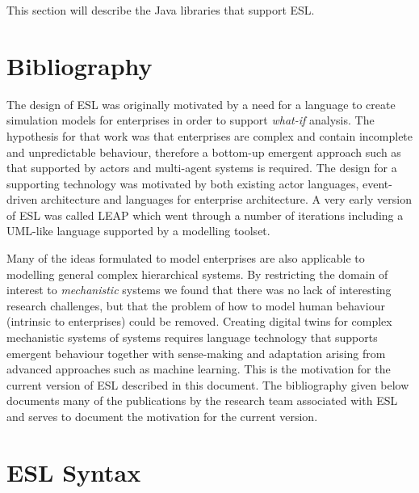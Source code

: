 \documentclass[5p,times]{elsarticle}
\begin{document}
This section will describe the Java libraries that support ESL.

\section{Bibliography}

\label{sec:bib}

The design of ESL was originally motivated by a need for a language to create simulation models for enterprises in order to support {\it what-if} analysis. The hypothesis for that work was that enterprises are complex and contain incomplete and unpredictable behaviour, therefore a bottom-up emergent approach such as that supported by actors and multi-agent systems is required. The design for a supporting technology was motivated by both existing actor languages, event-driven architecture and languages for enterprise architecture. A very early version of ESL was called LEAP which went through a number of iterations including a UML-like language supported by a modelling toolset. 

Many of the ideas formulated to model enterprises are also applicable to modelling general complex hierarchical systems. By restricting the domain of interest to {\it mechanistic} systems we found that there was no lack of interesting research challenges, but that the problem of how to model human behaviour (intrinsic to enterprises) could be removed. Creating digital twins for complex mechanistic systems of systems requires language technology that supports emergent behaviour together with sense-making and adaptation arising from advanced approaches such as machine learning. This is the motivation for the current version of ESL described in this document. The bibliography given below documents many of the publications by the research team associated with ESL and serves to document the motivation for the current version.

\nocite{*}



\clearpage

\appendix

\renewcommand*{\thesection}{\Alph{section}}

\section{ESL Syntax}

\label{sec:syntax}
\end{document}
